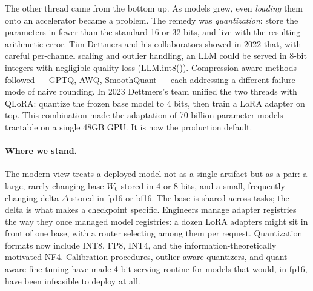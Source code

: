 The other thread came from the bottom up. As models grew, even
\emph{loading} them onto an accelerator became a problem. The
remedy was \emph{quantization}: store the parameters in fewer than
the standard 16 or 32 bits, and live with the resulting arithmetic
error. Tim Dettmers and his collaborators showed in 2022 that, with
careful per-channel scaling and outlier handling, an LLM could be
served in 8-bit integers with negligible quality loss
(LLM.int8()). Compression-aware methods followed --- GPTQ, AWQ,
SmoothQuant --- each addressing a different failure mode of naive
rounding. In 2023 Dettmers's team unified the two threads with
QLoRA: quantize the frozen base model to 4 bits, then train a LoRA
adapter on top. This combination made the adaptation of
70-billion-parameter models tractable on a single 48GB GPU. It is
now the production default.

\paragraph{Where we stand.}
The modern view treats a deployed model not as a single artifact
but as a pair: a large, rarely-changing base $W_0$ stored in 4 or 8
bits, and a small, frequently-changing delta $\Delta$ stored in
fp16 or bf16. The base is shared across tasks; the delta is what
makes a checkpoint specific. Engineers manage adapter registries
the way they once managed model registries: a dozen LoRA adapters
might sit in front of one base, with a router selecting among them
per request. Quantization formats now include INT8, FP8, INT4, and
the information-theoretically motivated NF4. Calibration
procedures, outlier-aware quantizers, and quant-aware fine-tuning
have made 4-bit serving routine for models that would, in fp16,
have been infeasible to deploy at all.

